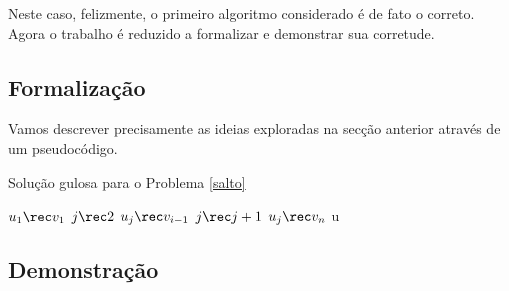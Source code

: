 Neste caso, felizmente, o primeiro algoritmo considerado é de fato o correto. Agora o trabalho é reduzido a formalizar e demonstrar sua corretude.

\subsection*{Formalização}

Vamos descrever precisamente as ideias exploradas na secção anterior através de um pseudocódigo.

\begin{algorithm}[h]
\caption{Solução gulosa para o Problema \ref{salto}}
\label{salto:code}
\begin{algorithmic}[1]
    \State $u_1 \rec v_1$
    \State $j \rec 2$
            \State $u_j \rec v_{i - 1}$
            \State $j \rec j + 1$
        \EndIf
    \EndFor
    \State $u_j \rec v_n$
    \State \Return u
\EndFunction
\end{algorithmic}
\end{algorithm}

\subsection*{Demonstração}

